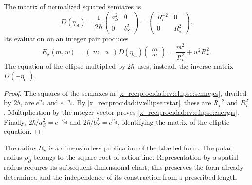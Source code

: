 \begin{proposition}
\label{x_reciprocidad:iv:ellipse:matriz-prop}
The matrix of normalized squared semiaxes is
\begin{equation}
 D(\eta_{\mathrm{el}})
 =\frac1{2\hbar}
    \begin{pmatrix}a_S^2&0\\0&b_S^2\end{pmatrix}
 =\begin{pmatrix}R_\star^{-2}&0\\0&R_\star^2\end{pmatrix}.
 \label{x_reciprocidad:iv:ellipse:matriz}
\end{equation}
Its evaluation on an integer pair produces
\begin{equation}
 E_\star(m,w)=
 \begin{pmatrix}m&w\end{pmatrix}
 D(\eta_{\mathrm{el}})
 \begin{pmatrix}m\\w\end{pmatrix}
 =\frac{m^2}{R_\star^2}+w^2R_\star^2.
 \label{x_reciprocidad:iv:ellipse:energia}
\end{equation}
The equation of the ellipse multiplied by \(2\hbar\)
uses, instead, the inverse matrix \(D(-\eta_{\mathrm{el}})\).
\end{proposition}
\begin{proof}
The squares of the semiaxes in
\eqref{x_reciprocidad:iv:ellipse:semiejes}, divided by \(2\hbar\),
are \(e^{\eta_{\mathrm{el}}}\) and
\(e^{-\eta_{\mathrm{el}}}\).
By \eqref{x_reciprocidad:iv:ellipse:rstar}, these are
\(R_\star^{-2}\) and \(R_\star^2\).
Multiplication by the integer vector proves
\eqref{x_reciprocidad:iv:ellipse:energia}. Finally,
\(2\hbar/a_S^2=e^{-\eta_{\mathrm{el}}}\) and
\(2\hbar/b_S^2=e^{\eta_{\mathrm{el}}}\), identifying
the matrix of the elliptic equation.
\end{proof}

The radius \(R_\star\) is a dimensionless publication of
the labelled form. The polar radius
\(\rho_{\partial}\) belongs to the square-root-of-action line.
Representation by a spatial radius requires its subsequent
dimensional chart; this preserves the form already determined
and the independence of its construction from a
prescribed length.
